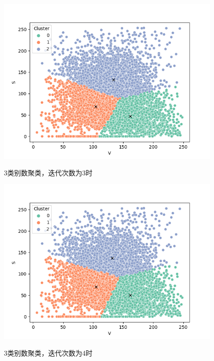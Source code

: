 \documentclass[UTF8]{ctexart}
\begin{document}
	\begin{figure}[htbp]
		\centering
		\caption{3类别数聚类，迭代次数为3时}
		\includegraphics[width=1.0\textwidth]{cluster3.png}
		\label{Fig.37}
	\end{figure}

	\begin{figure}[htbp]
		\centering
		\caption{3类别数聚类，迭代次数为4时}
		\includegraphics[width=1.0\textwidth]{cluster4.png}
		\label{Fig.38}
	\end{figure}
\end{document}
